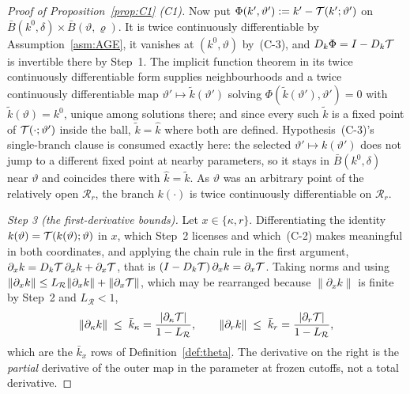 \begin{proof}[Proof of Proposition~\ref{prop:C1} (C1)]
Now put $\Phi(k',\vartheta') := k' - \mathcal{T}(k';\vartheta')$ on
$\bar B(k^0,\delta)\times\bar B(\vartheta,\varrho)$. It is twice continuously differentiable by
Assumption~\ref{asm:AGE}, it vanishes at $(k^0,\vartheta)$ by~(C-3), and
$D_k\Phi = I - D_k\mathcal{T}$ is invertible there by Step~1. The implicit function theorem in its twice
continuously differentiable form supplies neighbourhoods and a twice continuously differentiable map
$\vartheta'\mapsto\tilde k(\vartheta')$ solving $\Phi(\tilde k(\vartheta'),\vartheta') = 0$ with
$\tilde k(\vartheta) = k^0$, unique among solutions there; and since every such $\tilde k$ is a
fixed point of $\mathcal{T}(\cdot;\vartheta')$ inside the ball, $\tilde k = \hat k$ where both are
defined. Hypothesis~(C-3)'s single-branch clause is consumed exactly here: the selected
$\vartheta'\mapsto k(\vartheta')$ does not jump to a different fixed point at nearby parameters, so
it stays in $\bar B(k^0,\delta)$ near $\vartheta$ and coincides there with $\hat k = \tilde k$. As
$\vartheta$ was an arbitrary point of the relatively open $\mathcal R_r$, the branch $k(\cdot)$ is
twice continuously differentiable on $\mathcal R_r$.

\emph{Step 3 (the first-derivative bounds).} Let $x\in\{\kappa,r\}$. Differentiating the identity
$k(\vartheta) = \mathcal{T}(k(\vartheta);\vartheta)$ in $x$, which Step~2 licenses and which~(C-2) makes
meaningful in both coordinates, and applying the chain rule in the first argument,
$\partial_x k = D_k\mathcal{T}\,\partial_x k + \partial_x\mathcal{T}$, that is
$(I-D_k\mathcal{T})\,\partial_x k = \partial_x\mathcal{T}$. Taking norms and using
$\lVert\partial_x k\rVert \le L_{\mathcal R}\lVert\partial_x k\rVert + \lVert\partial_x\mathcal{T}\rVert$,
which may be rearranged because $\lVert\partial_x k\rVert$ is finite by Step~2 and
$L_{\mathcal R} < 1$,
\begin{equation}
\label{eq:C1-kbar}
\lVert\partial_\kappa k\rVert \;\le\; \bar k_\kappa = \frac{\lvert\partial_\kappa\mathcal{T}\rvert}{1-L_{\mathcal R}},
\qquad
\lVert\partial_r k\rVert \;\le\; \bar k_r = \frac{\lvert\partial_r\mathcal{T}\rvert}{1-L_{\mathcal R}},
\end{equation}
which are the $\bar k_x$ rows of Definition~\ref{def:theta}. The derivative on the right is the
\emph{partial} derivative of the outer map in the parameter at frozen cutoffs, not a total
derivative.


\end{proof}
